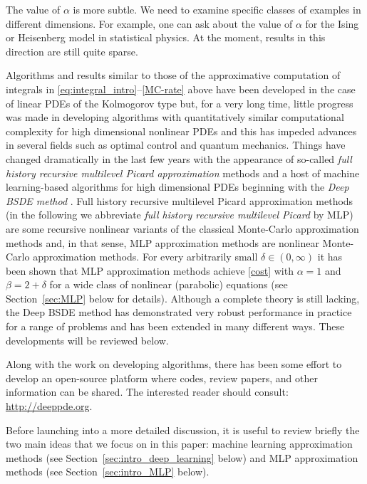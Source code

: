 \documentclass[12pt]{article}
\theoremstyle{definition}
\begin{document}
The value of $\alpha$ is more subtle. We need to examine specific classes of examples in different
dimensions.  For example, one can ask about the value of $\alpha$ for the Ising or Heisenberg model in
statistical physics.  At the moment, results in this direction are still quite sparse.


Algorithms and results similar to those of the approximative computation of integrals 
in \eqref{eq:integral_intro}--\eqref{MC-rate} above 
have been developed in the case of linear PDEs of the Kolmogorov type but, 
for a very long time,  little progress was made in developing algorithms with quantitatively similar computational complexity 
for high dimensional nonlinear PDEs and this has impeded advances in several fields such as  
optimal control and quantum mechanics.
Things have changed dramatically 
in the last few years 
with the appearance of 
so-called {\it full history recursive 
multilevel Picard approximation} methods \cite{E2016multilevel,E2019multilevel,Hutzenthaleretal2018arXiv} 
and a host of machine learning-based algorithms for high dimensional PDEs 
beginning with the {\it Deep BSDE method} \cite{EHanJentzen2017,HanJentzenE2018}. 
Full history recursive multilevel Picard approximation methods 
(in the following we abbreviate 
\emph{full history recursive multilevel Picard} by MLP) 
are some recursive nonlinear variants of the
classical Monte-Carlo approximation methods 
and, in that sense, MLP approximation methods are 
nonlinear Monte-Carlo approximation methods. 
For every arbitrarily small $ \delta \in (0,\infty) $ it has been shown 
that MLP approximation methods achieve \eqref{cost} with 
$ \alpha = 1 $ and $ \beta = 2 +\delta $ for a wide class of
nonlinear (parabolic) equations (see Section~\ref{sec:MLP} below for details). 
Although a complete theory is still lacking, the Deep BSDE method has demonstrated very
robust performance in practice for a range of problems and has been extended in many different ways.
These developments will be reviewed below. 

Along with the work on developing algorithms, there has been some effort to develop an open-source
platform where codes, review papers, and other information can be shared.  The interested reader should consult:
\url{http://deeppde.org}.

%
%

Before launching into a more detailed discussion, 
it is useful to review briefly the two main ideas that 
we focus on in this paper:
machine learning approximation methods 
(see Section~\ref{sec:intro_deep_learning} below) 
and MLP approximation methods 
(see Section~\ref{sec:intro_MLP} below).
\end{document}
